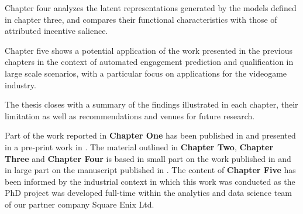 Chapter four analyzes the latent representations generated by the models defined in chapter three, and compares their functional characteristics with those of attributed incentive salience. 

Chapter five shows a potential application of the work presented in the previous chapters in the context of automated engagement prediction and qualification in large scale scenarios, with a particular focus on applications for the videogame industry.

The thesis closes with a summary of the findings illustrated in each chapter, their limitation as well as recommendations and venues for future research.

Part of the work reported in \textbf{Chapter One} has been published in \cite{bonometti2019modelling} and presented in a pre-print work in \cite{bonometti2020theory}. The material outlined in \textbf{Chapter Two}, \textbf{Chapter Three} and \textbf{Chapter Four} is based in small part on the work published in \cite{bonometti2019modelling} and in large part on the manuscript published in \cite{bonometti2021approximating}. The content of \textbf{Chapter Five} has been informed by the industrial context in which this work was conducted as the PhD project was developed full-time within the analytics and data science team of our partner company Square Enix Ltd.




